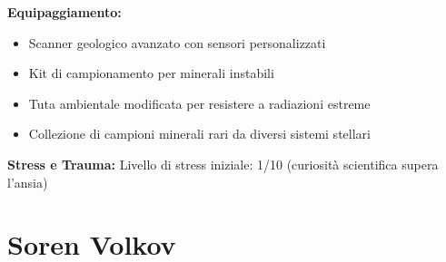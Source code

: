 \documentclass[11pt,a4paper]{article}
\begin{document}
\begin{tcolorbox}[colback=mininglightorange!20, colframe=miningorange]
\textbf{Equipaggiamento:}
\begin{itemize}[leftmargin=*]
\item Scanner geologico avanzato con sensori personalizzati
\item Kit di campionamento per minerali instabili
\item Tuta ambientale modificata per resistere a radiazioni estreme
\item Collezione di campioni minerali rari da diversi sistemi stellari
\end{itemize}

\textbf{Stress e Trauma:} Livello di stress iniziale: 1/10 (curiosità scientifica supera l'ansia)
\end{tcolorbox}

\section{Soren Volkov}
\end{document}
